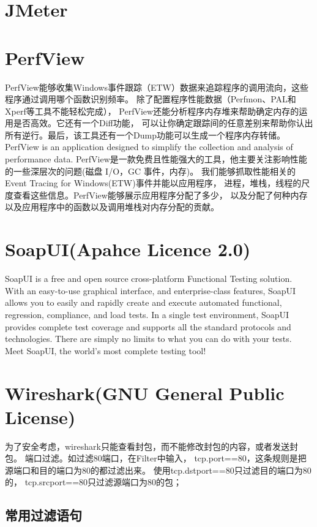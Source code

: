 \documentclass{book}
\begin{document}
\section{JMeter}

\section{PerfView}

PerfView能够收集Windows事件跟踪（ETW）数据来追踪程序的调用流向，这些程序通过调用哪个函数识别频率。
除了配置程序性能数据（Perfmon、PAL和Xperf等工具不能轻松完成），
PerfView还能分析程序内存堆来帮助确定内存的运用是否高效。它还有一个Diff功能，
可以让你确定跟踪间的任意差别来帮助你认出所有逆行。最后，该工具还有一个Dump功能可以生成一个程序内存转储。
PerfView is an application designed to simplify the collection and analysis of performance data.
PerfView是一款免费且性能强大的工具，他主要关注影响性能的一些深层次的问题(磁盘 I/O，GC 事件，内存)。
我们能够抓取性能相关的 Event Tracing for Windows(ETW)事件并能以应用程序，
进程，堆栈，线程的尺度查看这些信息。PerfView能够展示应用程序分配了多少，
以及分配了何种内存以及应用程序中的函数以及调用堆栈对内存分配的贡献。

\section{SoapUI(Apahce Licence 2.0)}

SoapUI is a free and open source cross-platform Functional Testing solution. 
With an easy-to-use graphical interface, and enterprise-class features, 
SoapUI allows you to easily and rapidly create and execute automated functional, 
regression, compliance, and load tests. In a single test environment, 
SoapUI provides complete test coverage and supports all the standard protocols 
and technologies. There are simply no limits to what you can do with your tests. 
Meet SoapUI, the world's most complete testing tool!

\section{Wireshark(GNU General Public License)}

为了安全考虑，wireshark只能查看封包，而不能修改封包的内容，或者发送封包。
端口过滤。如过滤80端口，在Filter中输入，
tcp.port==80，这条规则是把源端口和目的端口为80的都过滤出来。
使用tcp.dstport==80只过滤目的端口为80的，
tcp.srcport==80只过滤源端口为80的包；

\subsection{常用过滤语句}
\end{document}
